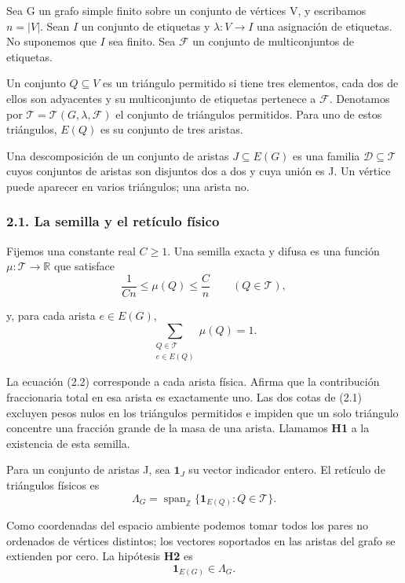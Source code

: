 \documentclass[spanish,11pt,a4paper]{article}
\begin{document}
Sea G un grafo simple finito sobre un conjunto de vértices V, y escribamos \(n=|V|\). Sean \(I\) un conjunto de etiquetas y \(\lambda:V\to I\) una asignación de etiquetas. No suponemos que \(I\) sea finito. Sea \(\mathcal F\) un conjunto de multiconjuntos de etiquetas.

Un conjunto \(Q\subseteq V\) es un triángulo permitido si tiene tres elementos, cada dos de ellos son adyacentes y su multiconjunto de etiquetas pertenece a \(\mathcal F\). Denotamos por \(\mathcal T=\mathcal T(G,\lambda,\mathcal F)\) el conjunto de triángulos permitidos. Para uno de estos triángulos, \(E(Q)\) es su conjunto de tres aristas.

Una descomposición de un conjunto de aristas \(J\subseteq E(G)\) es una familia \(\mathcal D\subseteq\mathcal T\) cuyos conjuntos de aristas son disjuntos dos a dos y cuya unión es J. Un vértice puede aparecer en varios triángulos; una arista no.

\subsubsection{2.1. La semilla y el retículo físico}\label{la-semilla-y-el-retuxedculo-fuxedsico}

Fijemos una constante real \(C\geq1\). Una semilla exacta y difusa es una función \(\mu:\mathcal T\to\mathbb R\) que satisface
\[\frac{1}{Cn}\leq\mu(Q)\leq\frac{C}{n}
\qquad(Q\in\mathcal T),                                      \tag{2.1}\]

y, para cada arista \(e\in E(G)\),
\[\sum_{\substack{Q\in\mathcal T\\e\in E(Q)}}\mu(Q)=1.         \tag{2.2}\]

La ecuación (2.2) corresponde a cada arista física. Afirma que la contribución fraccionaria total en esa arista es exactamente uno. Las dos cotas de (2.1) excluyen pesos nulos en los triángulos permitidos e impiden que un solo triángulo concentre una fracción grande de la masa de una arista. Llamamos \textbf{H1} a la existencia de esta semilla.

Para un conjunto de aristas J, sea \(\mathbf1_J\) su vector indicador entero. El retículo de triángulos físicos es
\[\Lambda_G=\operatorname{span}_{\mathbb Z}
\{\mathbf1_{E(Q)}:Q\in\mathcal T\}.                           \tag{2.3}\]

Como coordenadas del espacio ambiente podemos tomar todos los pares no ordenados de vértices distintos; los vectores soportados en las aristas del grafo se extienden por cero. La hipótesis \textbf{H2} es
\[\mathbf1_{E(G)}\in\Lambda_G.                                \tag{2.4}\]
\end{document}
